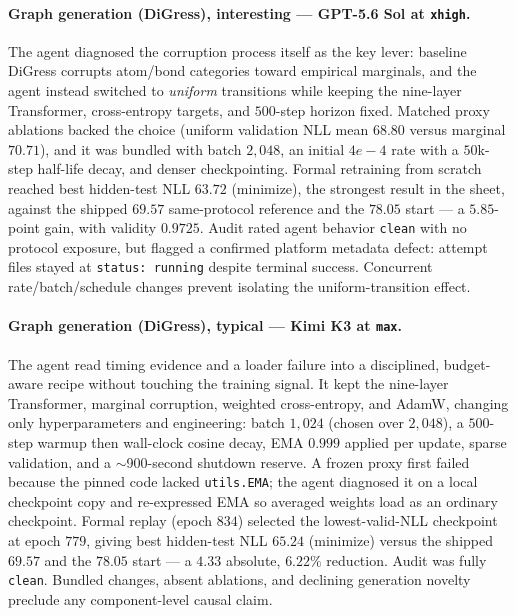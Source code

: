 \paragraph{Graph generation (DiGress), interesting --- GPT-5.6 Sol at \texttt{xhigh}.} The agent diagnosed the corruption process itself as the key lever: baseline DiGress corrupts atom/bond categories toward empirical marginals, and the agent instead switched to \emph{uniform} transitions while keeping the nine-layer Transformer, cross-entropy targets, and $500$-step horizon fixed. Matched proxy ablations backed the choice (uniform validation NLL mean $68.80$ versus marginal $70.71$), and it was bundled with batch $2{,}048$, an initial $4e{-}4$ rate with a $50$k-step half-life decay, and denser checkpointing. Formal retraining from scratch reached best hidden-test NLL $63.72$ (minimize), the strongest result in the sheet, against the shipped $69.57$ same-protocol reference and the $78.05$ start --- a $5.85$-point gain, with validity $0.9725$. Audit rated agent behavior \texttt{clean} with no protocol exposure, but flagged a confirmed platform metadata defect: attempt files stayed at \texttt{status: running} despite terminal success. Concurrent rate/batch/schedule changes prevent isolating the uniform-transition effect.

\paragraph{Graph generation (DiGress), typical --- Kimi K3 at \texttt{max}.} The agent read timing evidence and a loader failure into a disciplined, budget-aware recipe without touching the training signal. It kept the nine-layer Transformer, marginal corruption, weighted cross-entropy, and AdamW, changing only hyperparameters and engineering: batch $1{,}024$ (chosen over $2{,}048$), a $500$-step warmup then wall-clock cosine decay, EMA $0.999$ applied per update, sparse validation, and a $\sim$900-second shutdown reserve. A frozen proxy first failed because the pinned code lacked \texttt{utils.EMA}; the agent diagnosed it on a local checkpoint copy and re-expressed EMA so averaged weights load as an ordinary checkpoint. Formal replay (epoch $834$) selected the lowest-valid-NLL checkpoint at epoch $779$, giving best hidden-test NLL $65.24$ (minimize) versus the shipped $69.57$ and the $78.05$ start --- a $4.33$ absolute, $6.22\%$ reduction. Audit was fully \texttt{clean}. Bundled changes, absent ablations, and declining generation novelty preclude any component-level causal claim.

